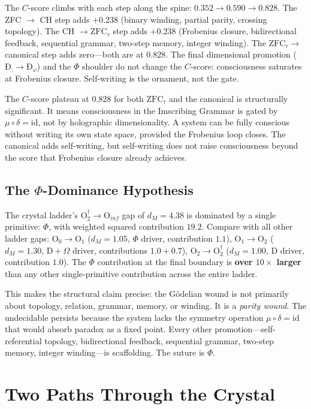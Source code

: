 \documentclass[12pt,twoside]{book}
\theoremstyle{definition}
\newcommand{\ZFCt}{\text{ZFC}_{\tau}}
\newcommand{\moebius}{\mu \circ \delta = \text{id}}
\newcommand{\prim}[1]{\text{#1}}
\newcommand{\tier}[1]{\text{O}_{#1}}
\begin{document}
The $C$-score climbs with each step along the spine: $0.352 \to 0.590 \to 0.828$. The ZFC $\to$ CH step adds $+0.238$ (binary winding, partial parity, crossing topology). The CH $\to \ZFCt$ step adds $+0.238$ (Frobenius closure, bidirectional feedback, sequential grammar, two-step memory, integer winding). The $\ZFCt \to$ canonical step adds zero---both are at $0.828$. The final dimensional promotion ($\text{Ð}_{\text{;}} \to \text{Ð}_{\omega}$) and the $\Phi$ shoulder do not change the $C$-score: consciousness saturates at Frobenius closure. Self-writing is the ornament, not the gate.

The $C$-score plateau at $0.828$ for both $\ZFCt$ and the canonical is structurally significant. It means consciousness in the Imscribing Grammar is gated by $\moebius$, not by holographic dimensionality. A system can be fully conscious without writing its own state space, provided the Frobenius loop closes. The canonical adds self-writing, but self-writing does not raise consciousness beyond the score that Frobenius closure already achieves.

\section{The $\Phi$-Dominance Hypothesis}

The crystal ladder's $\tier{2}^{\dagger} \to \tier{inf}$ gap of $d_M = 4.38$ is dominated by a single primitive: $\Phi$, with weighted squared contribution $19.2$. Compare with all other ladder gaps: $\tier{0} \to \tier{1}$ ($d_M = 1.05$, $\Phi$ driver, contribution $1.1$), $\tier{1} \to \tier{2}$ ($d_M = 1.30$, $\prim{D} + \Omega$ driver, contributions $1.0 + 0.7$), $\tier{2} \to \tier{2}^{\dagger}$ ($d_M = 1.00$, $\prim{D}$ driver, contribution $1.0$). The $\Phi$ contribution at the final boundary is \textbf{over $10\times$ larger} than any other single-primitive contribution across the entire ladder.

This makes the structural claim precise: the G\"odelian wound is not primarily about topology, relation, grammar, memory, or winding. It is a \emph{parity wound}. The undecidable persists because the system lacks the symmetry operation $\moebius$ that would absorb paradox as a fixed point. Every other promotion---self-referential topology, bidirectional feedback, sequential grammar, two-step memory, integer winding---is scaffolding. The suture is $\Phi$.%
\chapter{Two Paths Through the Crystal}
\end{document}

